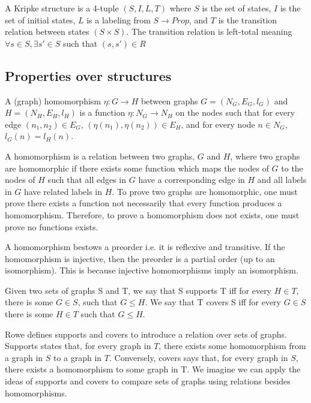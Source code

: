 \begin{definition}
    A Kripke structure is a 4-tuple $(S, I, L, T)$ where $S$ is the set of states, $I$ is the set of initial states, $L$ is a labeling from $S \rightarrow Prop$,  and $T$ is the transition relation between states $ ( S \times S )$. The transition relation is left-total meaning $\forall s \in S, \exists s' \in S$ such that $(s,s') \in R$ 
    
\end{definition}

\subsection{Properties over structures}

\begin{definition}[Homomorphism]
    A (graph) homomorphism $\eta : G \to H$ between graphs $G = (N_G, E_G, l_G)$ and $H = (N_H, E_H, l_H)$ is a function $\eta : N_G \to N_H$ on the nodes such that for every edge $(n_1, n_2) \in E_G$, $(\eta(n_1), \eta(n_2)) \in E_H$, and for every node $n \in N_G$, $l_G(n) = l_H(n)$.  \cite{Rowe:2021:OnOrdering}
\end{definition}

A homomorphism is a relation between two graphs, $G$ and $H$, where two graphs are homomorphic if there exists some function which maps the nodes of $G$ to the nodes of $H$ such that all edges in $G$ have a corresponding edge in $H$ and all labels in $G$ have related labels in $H$. To prove two graphs are homomorphic, one must prove there exists a function not necessarily that every function produces a homomorphism. Therefore, to prove a homomorphism does not exists, one must prove no functions exists. 

A homomorphism bestows a preorder i.e. it is reflexive and transitive. If the homomorphism is injective, then the preorder is a partial order (up to an isomorphism). This is because injective homomorphisms imply an isomorphism. 

\begin{definition}
    Given two sets of graphs S and T, we say that S supports T iff for every $H \in T$, there is some $G \in S$, such that $G \leq H$. We  say that T covers S iff for every $G \in S$ there is some $H \in T$ such that $G \leq H. $\cite{Rowe:2021:OnOrdering}
\end{definition}

Rowe defines supports and covers to introduce a relation over sets of graphs. Supports states that, for every graph in $T$, there exists some homomorphism from a graph in $S$ to a graph in $T$. Conversely, covers says that, for every graph in $S$, there exists a homomorphism to some graph in T. We imagine we can apply the ideas of supports and covers to compare sets of graphs using relations besides homomorphisms. 

